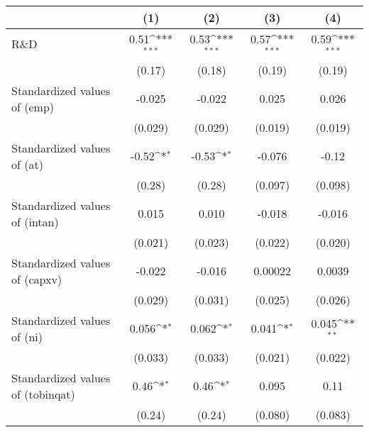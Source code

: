 {
\def\sym#1{\ifmmode^{#1}\else\(^{#1}\)\fi}
\begin{tabular}{l*{4}{c}}
\toprule
                    &\multicolumn{1}{c}{(1)}         &\multicolumn{1}{c}{(2)}         &\multicolumn{1}{c}{(3)}         &\multicolumn{1}{c}{(4)}         \\
\midrule
R\&D                &        0.51\sym{***}&        0.53\sym{***}&        0.57\sym{***}&        0.59\sym{***}\\
                    &      (0.17)         &      (0.18)         &      (0.19)         &      (0.19)         \\
\addlinespace
Standardized values of (emp)     &      -0.025         &      -0.022         &       0.025         &       0.026         \\
                    &     (0.029)         &     (0.029)         &     (0.019)         &     (0.019)         \\
\addlinespace
Standardized values of (at)     &       -0.52\sym{*}  &       -0.53\sym{*}  &      -0.076         &       -0.12         \\
                    &      (0.28)         &      (0.28)         &     (0.097)         &     (0.098)         \\
\addlinespace
Standardized values of (intan)     &       0.015         &       0.010         &      -0.018         &      -0.016         \\
                    &     (0.021)         &     (0.023)         &     (0.022)         &     (0.020)         \\
\addlinespace
Standardized values of (capxv)     &      -0.022         &      -0.016         &     0.00022         &      0.0039         \\
                    &     (0.029)         &     (0.031)         &     (0.025)         &     (0.026)         \\
\addlinespace
Standardized values of (ni)     &       0.056\sym{*}  &       0.062\sym{*}  &       0.041\sym{*}  &       0.045\sym{**} \\
                    &     (0.033)         &     (0.033)         &     (0.021)         &     (0.022)         \\
\addlinespace
Standardized values of (tobinqat)     &        0.46\sym{*}  &        0.46\sym{*}  &       0.095         &        0.11         \\
                    &      (0.24)         &      (0.24)         &     (0.080)         &     (0.083)         \\

\end{tabular}}
